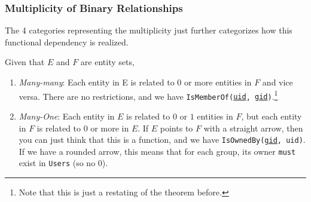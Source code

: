  \subsubsection{Multiplicity of Binary Relationships}

    The 4 categories representing the multiplicity just further categorizes how this functional dependency is realized. 

    \begin{definition}
      Given that $E$ and $F$ are entity sets, 
      \begin{enumerate}
        \item \textit{Many-many}: Each entity in E is related to $0$ or more entities in $F$ and vice versa. There are no restrictions, and we have \texttt{IsMemberOf(\underline{uid}, \underline{gid})}.\footnote{Note that this is just a restating of the theorem before.} 

        \begin{figure}[H]
          \centering 
          \caption{} 
          \label{fig:ismember}
        \end{figure}

        \item \textit{Many-One}: Each entity in $E$ is related to $0$ or $1$ entities in $F$, but each entity in $F$ is related to $0$ or more in $E$. If $E$ points to $F$ with a straight arrow, then you can just think that this is a function, and we have \texttt{IsOwnedBy(\underline{gid}, uid)}. If we have a rounded arrow, this means that for each group, its owner \texttt{must} exist in \texttt{Users} (so no $0$). 


\end{enumerate}
\end{definition}
